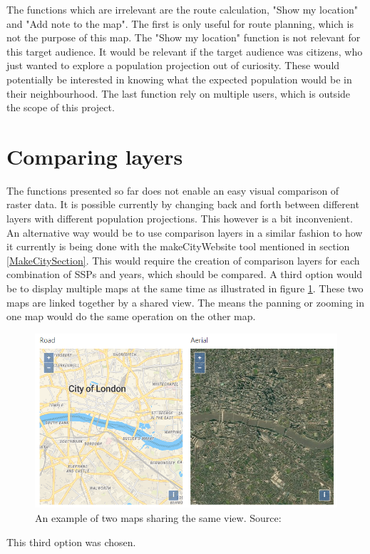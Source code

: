 The functions which are irrelevant are the route calculation, "Show my location" and "Add note to the map". The first is only useful for route planning, which is not the purpose of this map. The "Show my location" function is not relevant for this target audience. It would be relevant if the target audience was citizens, who just wanted to explore a population projection out of curiosity. These would potentially be interested in knowing what the expected population would be in their neighbourhood. The last function rely on multiple users, which is outside the scope of this project.

\section{Comparing layers}

The functions presented so far does not enable an easy visual comparison of raster data. It is possible currently by changing back and forth between different layers with different population projections. This however is a bit inconvenient. 
An alternative way would be to use comparison layers in a similar fashion to how it currently is being done with the makeCityWebsite tool mentioned in section \ref{MakeCitySection}. This would require the creation of comparison layers for each combination of SSPs and years, which should be compared.   
A third option would be to display multiple maps at the same time as illustrated in figure \ref{DualMapExample}. These two maps are linked together by a shared view. The means the panning or zooming in one map would do the same operation on the other map.

\begin{figure} [H]
	\centering
	\includegraphics[width=.8\textwidth]{Pictures/DualMapExample}
	\caption{An example of two maps sharing the same view. Source: \citet{DualmapExample}}
	\label{DualMapExample}
\end{figure}


This third option was chosen.